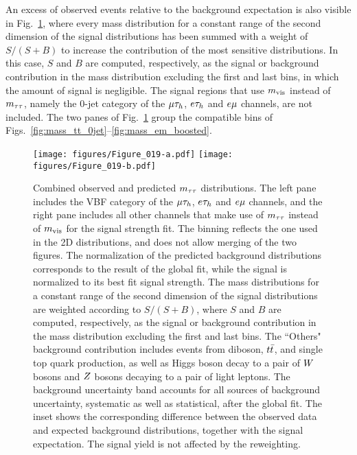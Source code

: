 An excess of observed events relative to the background expectation is also visible in Fig.~\ref{fig:massweighted}, where every mass distribution for a constant range of the second dimension of the signal distributions has been summed with a weight of $S/(S+B)$  to increase the contribution of the most sensitive distributions. In this case, $S$ and $B$ are computed, respectively, as the signal or background contribution in the mass distribution excluding the first and last bins, in which the amount of signal is negligible. The signal regions that use $m_\text{vis}$ instead of $m_{\tau\tau}$, namely the 0-jet category of the $\mu\tau_{h}$, $e\tau_{h}$ and $e\mu$ channels, are not included. The two panes of Fig.~\ref{fig:massweighted} group the compatible bins of Figs.~\ref{fig:mass_tt_0jet}--\ref{fig:mass_em_boosted}.

\begin{figure}[htb]
  \centering
    \texttt{[image: figures/Figure\_019-a.pdf]}
    \texttt{[image: figures/Figure\_019-b.pdf]}
   \caption{Combined observed and predicted $m_{\tau\tau}$ distributions. The left pane includes the VBF category of the $\mu\tau_{h}$, $e\tau_{h}$ and $e\mu$ channels, and the right pane includes all other channels that make use of $m_{\tau\tau}$ instead of $m_\text{vis}$ for the signal strength fit. The binning reflects the one used in the 2D distributions, and does not allow merging of the two figures. The normalization of the predicted background distributions corresponds to the result of the global fit, while the signal is normalized to its best fit signal strength. The mass distributions for a constant range of the second dimension of the signal distributions are weighted according to $S/(S+B)$, where $S$ and $B$ are computed, respectively, as the signal or background contribution in the mass distribution excluding the first and last bins. The ``Others" background contribution includes events from diboson, $t\bar{t}$, and single top quark production, as well as Higgs boson decay to a pair of $W$ bosons and $Z$ bosons decaying to a pair of light leptons. The background uncertainty band accounts for all sources of background uncertainty, systematic as well as statistical, after the global fit. The inset shows the corresponding difference between the observed data and expected background distributions, together with the signal expectation. The signal yield is not affected by the reweighting.
   }
    \label{fig:massweighted}

\end{figure}

